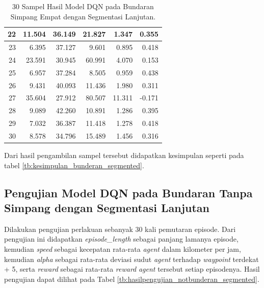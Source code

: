 \begin{table}[H]
{\begin{tabular}{|r|r|r|r|r|r|}
			22 & 11.504 & 36.149 & 21.827 & 1.347  & 0.355  \\ \hline
			23 & 6.395  & 37.127 & 9.601  & 0.895  & 0.418  \\ \hline
			24 & 23.591 & 30.945 & 60.991 & 4.070  & 0.153  \\ \hline
			25 & 6.957  & 37.284 & 8.505  & 0.959  & 0.438  \\ \hline
			26 & 9.431  & 40.093 & 11.436 & 1.980  & 0.311  \\ \hline
			27 & 35.604 & 27.912 & 80.507 & 11.311 & -0.171 \\ \hline
			28 & 9.089  & 42.260 & 10.891 & 1.286  & 0.395  \\ \hline
			29 & 7.032  & 36.387 & 11.418 & 1.278  & 0.418  \\ \hline
			30 & 8.578  & 34.796 & 15.489 & 1.456  & 0.316  \\ \hline
		\end{tabular}%
	}
	\caption{30 Sampel Hasil Model DQN pada Bundaran Simpang Empat dengan Segmentasi Lanjutan.}
	\label{tb:hasilpengujian_bunderan_segmented}
\end{table}


Dari hasil pengambilan sampel tersebut didapatkan kesimpulan seperti pada tabel \ref{tb:kesimpulan_bunderan_segmented}.


\begin{table}[H]
	\caption{Kesimpulan Hasil Model DQN pada Bundaran Simpang Empat dengan Segmentasi Lanjutan.}
	\label{tb:kesimpulan_bunderan_segmented}
\end{table}

\subsection{Pengujian Model DQN pada Bundaran Tanpa Simpang dengan Segmentasi Lanjutan}
\label{sec:pengujian_dqn_bundaran_nosimpang_segmentasi_hitam_putih}

Dilakukan pengujian perlakuan sebanyak 30 kali pemutaran episode. Dari pengujian ini didapatkan \textit{episode\_length }sebagai panjang lamanya episode, kemudian \textit{speed} sebagai kecepatan rata-rata \textit{agent} dalam kilometer per jam, kemudian \textit{alpha} sebagai rata-rata deviasi sudut \textit{agent} terhadap \textit{waypoint} terdekat + 5, serta \textit{reward} sebagai rata-rata \textit{reward }\textit{agent} tersebut setiap episodenya. Hasil pengujian dapat dilihat pada Tabel \ref{tb:hasilpengujian_notbunderan_segmented}.

